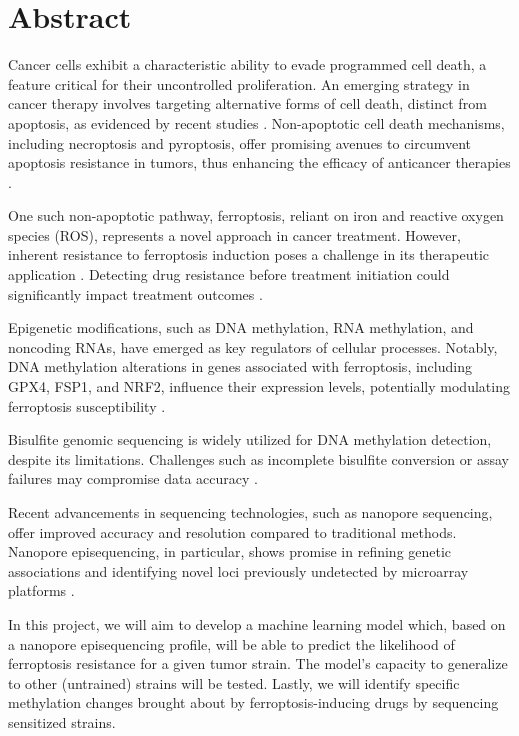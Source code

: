 \chapter{Abstract}

Cancer cells exhibit a characteristic ability to evade programmed cell death, a feature critical for their uncontrolled proliferation. An emerging strategy in cancer therapy involves targeting alternative forms of cell death, distinct from apoptosis, as evidenced by recent studies \citep{non-apoptotic2}. Non-apoptotic cell death mechanisms, including necroptosis and pyroptosis, offer promising avenues to circumvent apoptosis resistance in tumors, thus enhancing the efficacy of anticancer therapies \citep{non-apoptotic}.

One such non-apoptotic pathway, ferroptosis, reliant on iron and reactive oxygen species (ROS), represents a novel approach in cancer treatment. However, inherent resistance to ferroptosis induction poses a challenge in its therapeutic application \citep{resistance}. Detecting drug resistance before treatment initiation could significantly impact treatment outcomes \citep{prediction}.

Epigenetic modifications, such as DNA methylation, RNA methylation, and noncoding RNAs, have emerged as key regulators of cellular processes. Notably, DNA methylation alterations in genes associated with ferroptosis, including GPX4, FSP1, and NRF2, influence their expression levels, potentially modulating ferroptosis susceptibility \citep{methylation}.

Bisulfite genomic sequencing is widely utilized for DNA methylation detection, despite its limitations. Challenges such as incomplete bisulfite conversion or assay failures may compromise data accuracy \citep{bisulfite2, bisulfite}.

Recent advancements in sequencing technologies, such as nanopore sequencing, offer improved accuracy and resolution compared to traditional methods. Nanopore episequencing, in particular, shows promise in refining genetic associations and identifying novel loci previously undetected by microarray platforms \citep{npepi, npepi2}.

In this project, we will aim to develop a machine learning model which, based on a nanopore episequencing profile, will be able to predict the likelihood of ferroptosis resistance for a given tumor strain. The model's capacity to generalize to other (untrained) strains will be tested. Lastly, we will identify specific methylation changes brought about by ferroptosis-inducing drugs by sequencing sensitized strains.